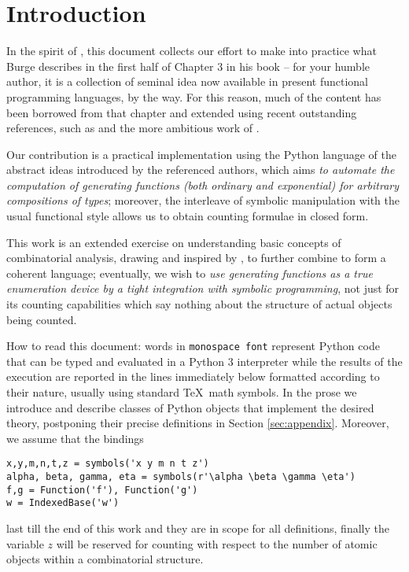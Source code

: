 
\section{Introduction}

In the spirit of \citet{burge1975recursive}, this document collects our effort
to make into practice what Burge describes in the first half of Chapter $3$ in
his book -- for your humble author, it is a collection of seminal idea now
available in present functional programming languages, by the way. For this
reason, much of the content has been borrowed from that chapter and extended
using recent outstanding references, such as \citet{sedgewick2014introduction}
and the more ambitious work of \citet{flajolet2009analytic}.

Our contribution is a practical implementation using the Python language of the
abstract ideas introduced by the referenced authors, which aims \emph{to
automate the computation of generating functions (both ordinary and
exponential) for arbitrary compositions of types}; moreover, the interleave of
symbolic manipulation with the usual functional style allows us to obtain
counting formulae in closed form.

This work is an extended exercise on understanding basic concepts of
combinatorial analysis, drawing and inspired by
\citet{riordan2002introduction}, to further combine to form a coherent
language; eventually, we wish to \textit{use generating functions as a true
enumeration device by a tight integration with symbolic programming}, not just
for its counting capabilities which say nothing about the structure of actual
objects being counted. 

How to read this document: words in \texttt{monospace font} represent Python
code that can be typed and evaluated in a Python 3 interpreter while the
results of the execution are reported in the lines immediately below formatted
according to their nature, usually using standard \TeX\, math symbols. In the
prose we introduce and describe classes of Python objects that implement the
desired theory, postponing their precise definitions in Section
\ref{sec:appendix}. Moreover, we assume that the bindings
\begin{verbatim}
x,y,m,n,t,z = symbols('x y m n t z')
alpha, beta, gamma, eta = symbols(r'\alpha \beta \gamma \eta')
f,g = Function('f'), Function('g')
w = IndexedBase('w')
\end{verbatim}
last till the end of this work and they are in scope for all definitions, finally
the variable $z$ will be reserved for counting with respect to the number of
atomic objects within a combinatorial structure.

